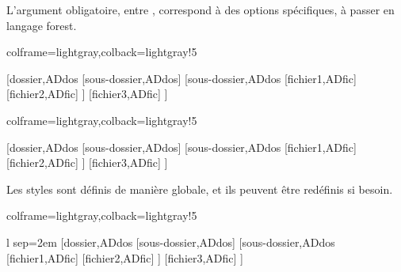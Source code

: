 \documentclass[11pt,a4paper]{ltxdoc}
\begin{document}
L'argument obligatoire, entre , correspond à des options spécifiques, à passer en langage \textsf{forest}.

\begin{tcblisting}{colframe=lightgray,colback=lightgray!5}
\begin{ArborDossiers}{}
    [dossier,ADdos
        [sous-dossier,ADdos]
        [sous-dossier,ADdos
            [fichier1,ADfic]
            [fichier2,ADfic]
        ]
        [fichier3,ADfic]
    ]
\end{ArborDossiers}
\end{tcblisting}

\begin{tcblisting}{colframe=lightgray,colback=lightgray!5}
\begin{ArborDossiers}%
    [Police=\sffamily,CoulIcoD=yellow!50!pink,AffIcoF,CoulIcoF=teal,EspaceV=0.5em]%
    {}
    [dossier,ADdos
        [sous-dossier,ADdos]
        [sous-dossier,ADdos
            [fichier1,ADfic]
            [fichier2,ADfic]
        ]
        [fichier3,ADfic]
    ]
\end{ArborDossiers}
\end{tcblisting}

Les styles sont définis de manière globale, et ils peuvent être redéfinis si besoin.

\begin{tcblisting}{colframe=lightgray,colback=lightgray!5}
\begin{ArborDossiers}%
    [Police=\sffamily,CoulIcoD=yellow!50!pink,AffIcoF,CoulIcoF=teal,EspaceV=0.5em]%
    {l sep=2em}
    [dossier,ADdos
        [sous-dossier,ADdos]
        [sous-dossier,ADdos
            [fichier1,ADfic]
            [fichier2,ADfic]
        ]
        [fichier3,ADfic]
    ]
\end{ArborDossiers}
\end{tcblisting}
\end{document}
